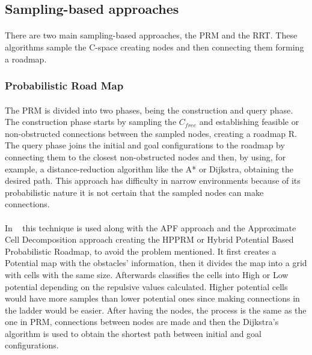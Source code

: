 \subsection{Sampling-based approaches}
\label{subsec:SB}
\paragraph{}There are two main sampling-based approaches, the \gls{PRM} and the \gls{RRT}. These algorithms sample the C-space
creating nodes and then connecting them forming a roadmap. 

\subsubsection{Probabilistic Road Map}
\label{subsubsec:PRM}
\paragraph{}The \gls{PRM} is divided into two phases, 
being the construction and query phase. The construction phase starts by sampling the $C_{free}$ and establishing feasible or non-obstructed connections between the sampled nodes, 
creating a roadmap R. The query phase joins the initial and goal configurations to the roadmap by connecting them to the closest non-obstructed nodes and then, by using, for example, 
a distance-reduction algorithm like the A* or Dijkstra, obtaining the desired path. 
This approach has difficulty in narrow environments because of its probabilistic nature it is not certain that the sampled nodes can make connections.

\paragraph{}In ~\cite{9286439} this technique is used along with the \gls{APF} approach and the Approximate Cell Decomposition approach creating the HPPRM or 
Hybrid Potential Based Probabilistic Roadmap, to avoid the problem mentioned. It first creates a Potential map with the obstacles’ information, 
then it divides the map into a grid with cells with the same size. Afterwards classifies the cells into High or Low potential depending on the repulsive values calculated. 
Higher potential cells would have more samples than lower potential ones since making connections in the ladder would be easier. After having the nodes, 
the process is the same as the one in \gls{PRM}, connections between nodes are made and then the Dijkstra’s algorithm is used to obtain the shortest path between initial and 
goal configurations.

